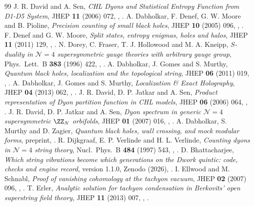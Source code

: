 \begin{thebibliography}{99}
 J. R. David and A. Sen, \emph{CHL Dyons and Statistical Entropy Function from D1-D5 System}, JHEP \textbf{11} (2006) 072, , .
 A. Dabholkar, F. Denef, G. W. Moore and B. Pioline, \emph{Precision counting of small black holes}, JHEP \textbf{10} (2005) 096, , .
 F. Denef and G. W. Moore, \emph{Split states, entropy enigmas, holes and halos}, JHEP \textbf{11} (2011) 129, , .
 N. Dorey, C. Fraser, T. J. Hollowood and M. A. Kneipp, \emph{$S$-duality in $\mathcal N=4$ supersymmetric gauge theories with arbitrary gauge group}, Phys.\ Lett.\ B \textbf{383} (1996) 422, , .
 A. Dabholkar, J. Gomes and S. Murthy, \emph{Quantum black holes, localization and the topological string}, JHEP \textbf{06} (2011) 019, , .
 A. Dabholkar, J. Gomes and S. Murthy, \emph{Localization \& Exact Holography}, JHEP \textbf{04} (2013) 062, , .
 J. R. David, D. P. Jatkar and A. Sen, \emph{Product representation of Dyon partition function in CHL models}, JHEP \textbf{06} (2006) 064, , .
 J. R. David, D. P. Jatkar and A. Sen, \emph{Dyon spectrum in generic $\mathcal N=4$ supersymmetric $\ZZ_N$ orbifolds}, JHEP \textbf{01} (2007) 016, , .
 A. Dabholkar, S. Murthy and D. Zagier, \emph{Quantum black holes, wall crossing, and mock modular forms}, preprint, .
 R. Dijkgraaf, E. P. Verlinde and H. L. Verlinde, \emph{Counting dyons in $\mathcal N=4$ string theory}, Nucl.\ Phys.\ B \textbf{484} (1997) 543, , .
 D. Bhattacharjee, \emph{Which string vibrations become which generations on the Dwork quintic: code, checks and engine record}, version 1.1.0, Zenodo (2026), .
 I. Ellwood and M. Schnabl, \emph{Proof of vanishing cohomology at the tachyon vacuum}, JHEP \textbf{02} (2007) 096, , .
 T. Erler, \emph{Analytic solution for tachyon condensation in Ber\-ko\-vits' open superstring field theory}, JHEP \textbf{11} (2013) 007, , .

\end{thebibliography}
